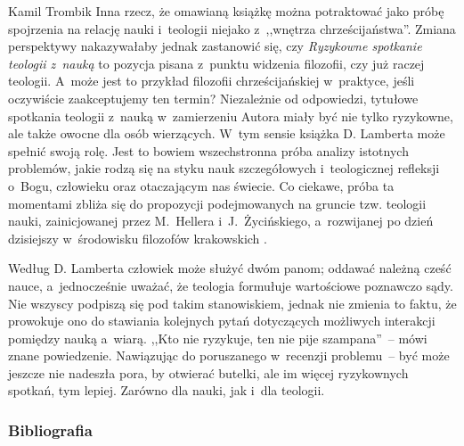 \begin{recplenv}{Kamil Trombik}
Inna rzecz, że omawianą książkę można potraktować jako próbę spojrzenia na relację nauki i~teologii niejako z~,,wnętrza
chrześcijaństwa''. Zmiana perspektywy nakazywałaby jednak zastanowić się, czy \textit{Ryzykowne spotkanie
teologii z~nauką} to pozycja pisana z~punktu widzenia filozofii, czy już raczej teologii. A~może jest to przykład filozofii
chrześcijańskiej w~praktyce, jeśli oczywiście zaakceptujemy ten termin? Niezależnie od odpowiedzi, tytułowe spotkania
teologii z~nauką w~zamierzeniu Autora miały być nie tylko ryzykowne, ale także owocne dla osób wierzących. W~tym sensie
książka D. Lamberta może spełnić swoją rolę. Jest to bowiem wszechstronna próba analizy istotnych problemów, jakie
rodzą się na styku nauk szczegółowych i~teologicznej refleksji o~Bogu, człowieku oraz otaczającym nas świecie. Co
ciekawe, próba ta momentami zbliża się do propozycji podejmowanych na gruncie tzw. teologii nauki, zainicjowanej przez
M.~Hellera i~J.~Życińskiego, a~rozwijanej po dzień dzisiejszy w~środowisku filozofów krakowskich
\parencite{polak_teologia_2015,obolevitch_problem_2012}.

Według D. Lamberta człowiek może służyć dwóm panom; oddawać należną cześć nauce, a~jednocześnie uważać, że teologia
formułuje wartościowe poznawczo sądy. Nie wszyscy podpiszą się pod takim stanowiskiem, jednak nie zmienia to faktu, że
prowokuje ono do stawiania kolejnych pytań dotyczących możliwych interakcji pomiędzy nauką a~wiarą. ,,Kto nie ryzykuje,
ten nie pije szampana''~-- mówi znane powiedzenie. Nawiązując do poruszanego w~recenzji problemu~-- być może jeszcze nie
nadeszła pora, by otwierać butelki, ale im więcej ryzykownych spotkań, tym lepiej. Zarówno dla nauki, jak i~dla
teologii. 





\subsubsection{Bibliografia}\nopagebreak[4]
\end{recplenv}


